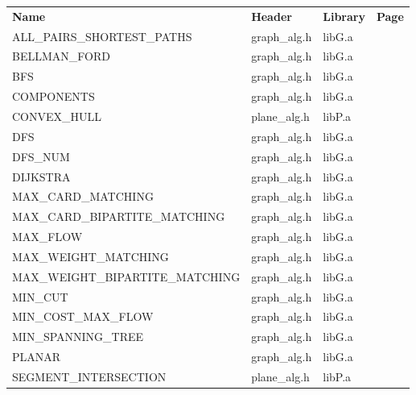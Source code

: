 \bigskip
\begin{tabular}{llll}
{\bf Name}                     &{\bf Header}      &{\bf Library}  &{\bf Page}\\
\noalign{\smallskip}
ALL\_PAIRS\_SHORTEST\_PATHS       &graph\_alg.h   &libG.a           &\pageref{Network Algorithms}\\
BELLMAN\_FORD                     &graph\_alg.h   &libG.a           &\pageref{Network Algorithms}\\
BFS                               &graph\_alg.h   &libG.a           &\pageref{Basic Algorithms}\\
COMPONENTS                        &graph\_alg.h   &libG.a           &\pageref{Basic Algorithms}\\
CONVEX\_HULL                      &plane\_alg.h   &libP.a           &\pageref{Plane Algorithms}\\
DFS                               &graph\_alg.h   &libG.a           &\pageref{Basic Algorithms}\\
DFS\_NUM                          &graph\_alg.h   &libG.a           &\pageref{Basic Algorithms}\\
DIJKSTRA                          &graph\_alg.h   &libG.a           &\pageref{Network Algorithms}\\
MAX\_CARD\_MATCHING               &graph\_alg.h   &libG.a           &\pageref{Network Algorithms}\\
MAX\_CARD\_BIPARTITE\_MATCHING    &graph\_alg.h   &libG.a           &\pageref{Network Algorithms}\\
MAX\_FLOW                         &graph\_alg.h   &libG.a           &\pageref{Network Algorithms}\\
MAX\_WEIGHT\_MATCHING             &graph\_alg.h   &libG.a           &\pageref{Network Algorithms}\\
MAX\_WEIGHT\_BIPARTITE\_MATCHING  &graph\_alg.h   &libG.a           &\pageref{Network Algorithms}\\
MIN\_CUT                          &graph\_alg.h   &libG.a           &\pageref{Network Algorithms}\\
MIN\_COST\_MAX\_FLOW              &graph\_alg.h   &libG.a           &\pageref{Network Algorithms}\\
MIN\_SPANNING\_TREE               &graph\_alg.h   &libG.a           &\pageref{Network Algorithms}\\
PLANAR                            &graph\_alg.h   &libG.a           &\pageref{Algorithms for Planar Graphs}\\
SEGMENT\_INTERSECTION             &plane\_alg.h   &libP.a           &\pageref{Plane Algorithms}\\

\end{tabular}
